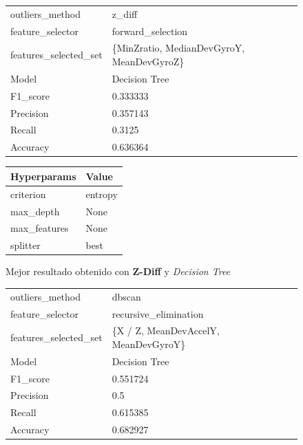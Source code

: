 \begin{appendices}
		\begin{figure}[htb]
			\centering
			\begin{tabular}{ll}
				\toprule
					  outliers\_method &                                    z\_diff \\
					 feature\_selector &                         forward\_selection \\
				features\_selected\_set & \{MinZratio, MedianDevGyroY, MeanDevGyroZ\} \\
								Model &                             Decision Tree \\
						F1\_score &                                  0.333333 \\
					   Precision &                                  0.357143 \\
						  Recall &                                    0.3125 \\
						Accuracy &                                  0.636364 \\
				\bottomrule
			\end{tabular}
			\newline
			\newline

			\begin{tabular}{ll}
				\toprule
				 Hyperparams &   Value \\
				\midrule
				   criterion & entropy \\
				   max\_depth &    None \\
				max\_features &    None \\
					splitter &    best \\
				\bottomrule
			\end{tabular}
			\caption{Mejor resultado obtenido con \textbf{Z-Diff} y \emph{Decision Tree}}
			\label{table:22}
		\end{figure}

		\begin{figure}[htb]
			\centering
			\begin{tabular}{ll}
				\toprule
					  outliers\_method &                               dbscan \\
					 feature\_selector &                recursive\_elimination \\
				features\_selected\_set & \{X / Z, MeanDevAccelY, MeanDevGyroY\} \\
								Model &                        Decision Tree \\
						F1\_score &                             0.551724 \\
					   Precision &                                  0.5 \\
						  Recall &                             0.615385 \\
						Accuracy &                             0.682927 \\
				\bottomrule
			\end{tabular}
			\newline
			\newline


\end{figure}
\end{appendices}
